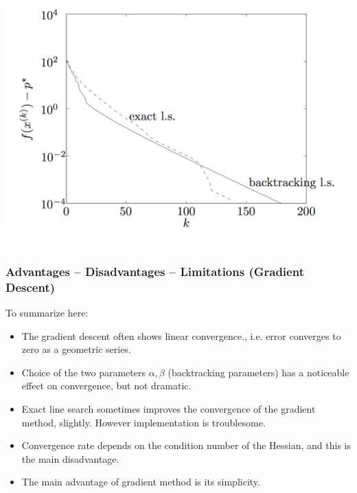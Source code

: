 \begin{frame}
{\begin{columns}
\begin{column}{0.5\textwidth}
\includegraphics[scale = 0.15]{pics/error.png}
  \end{column}
\end{columns}

}


\end{frame}

\subsection{}
\begin{frame}
  \frametitle{Advantages -- Disadvantages -- Limitations (Gradient
    Descent)}
To summarize here:
  \begin{itemize}
  \item The gradient descent often shows linear convergence.,
i.e. error converges to zero as a geometric series.
\item Choice of the two parameters $\alpha, \beta$ (backtracking parameters) has
  a noticeable effect on convergence, but not dramatic.
\item Exact line search sometimes improves the convergence of the
  gradient method, slightly. However implementation is troublesome.
\item Convergence rate depends on the condition number of the Hessian,
  and this is the main disadvantage.
\item The main advantage of gradient method is its simplicity.
  \end{itemize}

\end{frame}


